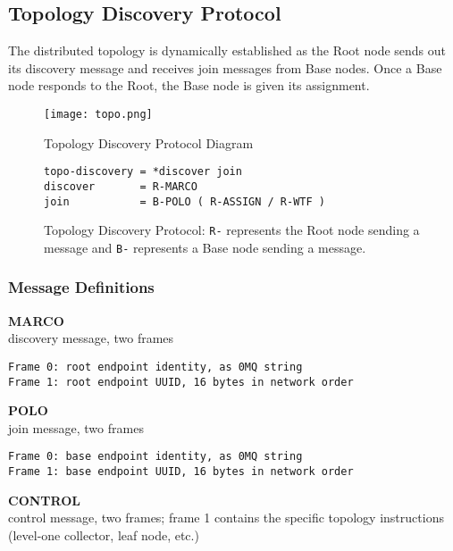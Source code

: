 \subsection{Topology Discovery Protocol}
\label{proto_topo}

The \dcamp distributed topology is dynamically established as the Root node sends out its discovery message and receives
join messages from Base nodes. Once a Base node responds to the Root, the Base node is given its assignment.

\begin{figure}[ht]
    \centering
    \texttt{[image: topo.png]}
    \label{fig:proto_topo_image}
    \caption{Topology Discovery Protocol Diagram}
\end{figure}

\begin{figure}[ht]
\vspace{+10pt}
\begin{verbatim}
topo-discovery = *discover join
discover       = R-MARCO
join           = B-POLO ( R-ASSIGN / R-WTF )
\end{verbatim}
\vspace{-5pt}
\caption[Topology Discovery Protocol]
        {Topology Discovery Protocol: \texttt{R-} represents the Root node sending a message and \texttt{B-}
         represents a Base node sending a message.}
\label{fig:proto_topo_spec}
\end{figure}

\subsubsection{Message Definitions}

\textbf{MARCO} \\
discovery message, two frames

\begin{verbatim}
Frame 0: root endpoint identity, as 0MQ string
Frame 1: root endpoint UUID, 16 bytes in network order
\end{verbatim}

\textbf{POLO} \\
join message, two frames

\begin{verbatim}
Frame 0: base endpoint identity, as 0MQ string
Frame 1: base endpoint UUID, 16 bytes in network order
\end{verbatim}

\textbf{CONTROL} \\
control message, two frames; frame 1 contains the specific topology instructions (level-one collector, leaf node, etc.)

